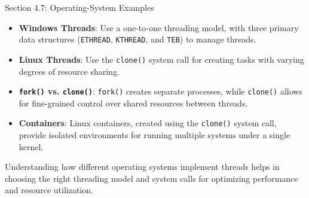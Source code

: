 \begin{notes}{Section 4.7: Operating-System Examples}
\begin{highlight}
    \end{highlight}
    
    \begin{highlight}
    
        \begin{itemize}
            \item \textbf{Windows Threads}: Use a one-to-one threading model, with three primary data structures (\texttt{ETHREAD}, \texttt{KTHREAD}, and \texttt{TEB}) to manage threads.
            \item \textbf{Linux Threads}: Use the \texttt{clone()} system call for creating tasks with varying degrees of resource sharing.
            \item \textbf{\texttt{fork()} vs. \texttt{clone()}}: \texttt{fork()} creates separate processes, while \texttt{clone()} allows for fine-grained control over shared resources between threads.
            \item \textbf{Containers}: Linux containers, created using the \texttt{clone()} system call, provide isolated environments for running multiple systems under a single kernel.
        \end{itemize}
    
    Understanding how different operating systems implement threads helps in choosing the right threading model and system calls for optimizing performance and resource utilization.
    
    \end{highlight}
\end{notes}


